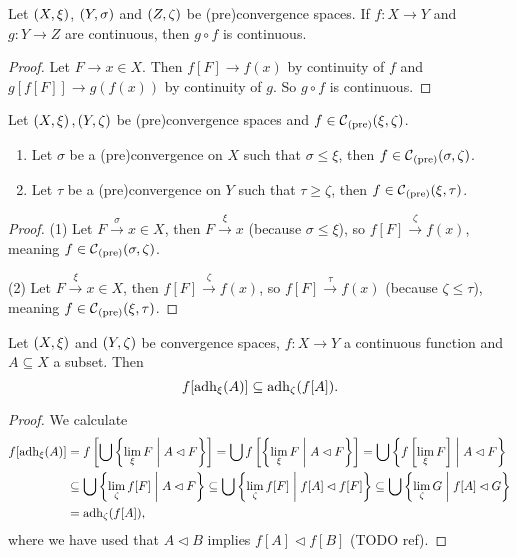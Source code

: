 \begin{lemma} \label{continuityComposition}
Let $\left( X,\xi \right)$, $\left( Y,\sigma \right)$ and $\left( Z,\zeta \right)$ be (pre)convergence spaces. If $f: X\to Y$ and $g: Y\to Z$ are continuous, then $g\circ f$ is continuous.
\end{lemma}
\begin{proof}
Let $F\to x\in X$. Then $f[F] \to f(x)$ by continuity of $f$ and $g[f[F]] \to g(f(x))$ by continuity of $g$. So $g\circ f$ is continuous.
\end{proof}

\begin{lemma} \label{finerCoarserContinuity}
Let $\left( X,\xi \right), \left( Y,\zeta \right)$ be (pre)convergence spaces and $f\in \operatorname{\mathcal{C}}_\text{(pre)}(\xi, \zeta)$.
\begin{enumerate}
\item Let $\sigma$ be a (pre)convergence on $X$ such that $\sigma \leq \xi$, then $f\in \operatorname{\mathcal{C}}_\text{(pre)}(\sigma, \zeta)$.
\item Let $\tau$ be a (pre)convergence on $Y$ such that $\tau \geq \zeta$, then $f\in \operatorname{\mathcal{C}}_\text{(pre)}(\xi, \tau)$.
\end{enumerate}
\end{lemma}
\begin{proof}
(1) Let $F\overset{\sigma}{\longrightarrow} x \in X$, then $F\overset{\xi}{\longrightarrow} x$ (because $\sigma \leq \xi$), so $f[F]\overset{\zeta}{\longrightarrow} f(x)$, meaning $f\in \operatorname{\mathcal{C}}_\text{(pre)}(\sigma, \zeta)$.

(2) Let $F\overset{\xi}{\longrightarrow} x \in X$, then $f[F]\overset{\zeta}{\longrightarrow} f(x)$, so $f[F]\overset{\tau}{\longrightarrow} f(x)$  (because $\zeta \leq \tau$), meaning $f\in \operatorname{\mathcal{C}}_\text{(pre)}(\xi, \tau)$.
\end{proof}

\begin{proposition} \label{adherenceContinuity}
Let $\left( X,\xi \right)$ and $\left( Y,\zeta \right)$ be convergence spaces, $f: X\to Y$ a continuous function and $A\subseteq X$ a subset. Then
\[ f[\operatorname{adh}_\xi(A)] \subseteq \operatorname{adh}_\zeta(f[A]). \]
\end{proposition}
\begin{proof}
We calculate
\begin{align*}
f[\operatorname{adh}_\xi(A)] &= f\left[\bigcup \left\{ \lim_\xi F \;\middle|\; A \lhd F \right\} \right] = \bigcup f\left[ \left\{ \lim_\xi F \;\middle|\; A \lhd F \right\} \right] = \bigcup \left\{ f\left[\lim_\xi F\right] \;\middle|\; A \lhd F \right\} \\
&\subseteq \bigcup \left\{ \lim_\zeta f[F] \;\middle|\; A \lhd F \right\} \subseteq \bigcup \left\{ \lim_\zeta f[F] \;\middle|\; f[A] \lhd f[F] \right\} \subseteq \bigcup \left\{ \lim_\zeta G \;\middle|\; f[A] \lhd G \right\} \\
&= \operatorname{adh}_\zeta(f[A]),
\end{align*}
where we have used that $A \lhd B$ implies $f[A] \lhd f[B]$ (TODO ref).
\end{proof}

